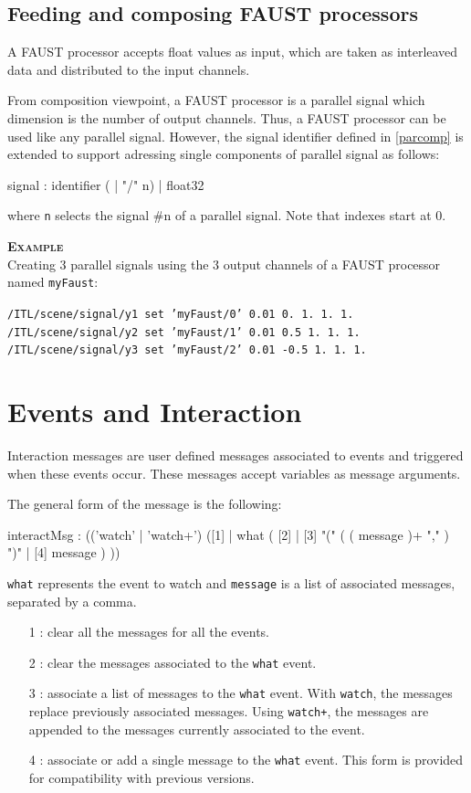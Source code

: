 \documentclass[a4paper,twoside]{report}
\newcommand{\toplevel}[1]	{\chapter{#1}}
\newcommand{\sublevel}[1]	{\section{#1}}
\newcommand{\OSC}[1]		{\texttt{#1}}
\newcommand{\values}[1]	{\texttt{#1}}
\newcommand{\example}		{\textbf{\hspace{-1.5cm}\textbf{\textsc{Example }}}}
\newcommand{\sample}	[1]			{\vspace{-2mm}\begin{center}\colorbox{mygrey}{
								\begin{minipage}[t]{0.9\columnwidth} 
								{\small \texttt{#1}}
								\end{minipage}}\end{center}}
\begin{document}
\sublevel{Feeding and composing FAUST processors}
\label{composefaust}

A FAUST processor accepts float values as input, which are taken as interleaved data and distributed to the input channels.

From composition viewpoint, a FAUST processor is a parallel signal which dimension is the number of output channels. 
Thus, a FAUST processor can be used like any parallel signal. However, the signal identifier defined in \ref{parcomp} is extended to support adressing single components of parallel signal as follows:
\begin{rail}
signal :  
		  identifier ( | "/" n)
		| float32
\end{rail}
where \values{n} selects the signal \#n of a parallel signal. Note that indexes start at 0.

\example \\
Creating 3 parallel signals using the 3 output channels of a FAUST processor named \OSC{myFaust}:
\sample{/ITL/scene/signal/y1 set 'myFaust/0' 0.01 0. 1. 1. 1. \\
/ITL/scene/signal/y2 set 'myFaust/1' 0.01 0.5 1. 1. 1. \\
/ITL/scene/signal/y3 set 'myFaust/2' 0.01 -0.5 1. 1. 1.
}

\toplevel{Events and Interaction}
\label{interaction}

Interaction messages are user defined messages associated to events and triggered when these events occur. These messages accept variables as message arguments.

The general form of the message is the following:
\begin{rail}
interactMsg : (('watch' | 'watch+')  ([1] | 
					what  ( [2] 
							| [3] "(" ( ( message  )+ "," ) ")" 
							| [4] message )  )) 
\end{rail}

\OSC{what} represents the event to watch and \OSC{message} is a list of associated messages, separated by a comma. 

\begin{itemize}
\item [1]: clear all the messages for all the events.
\item [2]: clear the messages associated to the \OSC{what} event.
\item [3]: associate a list of messages to the \OSC{what} event. With \OSC{watch}, the messages replace previously associated messages. Using \OSC{watch+}, the messages are appended to the messages currently associated to the event.
\item [4]: associate or add a single message to the \OSC{what} event. This form is provided for compatibility with previous versions.
\end{itemize}
\end{document}
